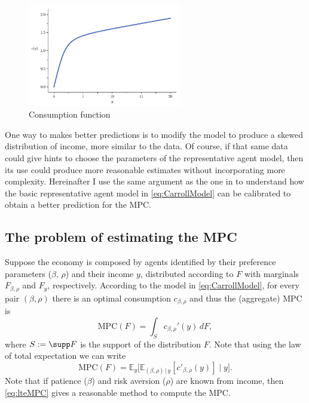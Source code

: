 \documentclass[english, a4paper, 12pt]{article}
\begin{document}
	\begin{figure}[H]
		\caption{Consumption function}
		\label{fig:concaveC}
		\includegraphics[width=0.6\textwidth]{CarrollCons}
		\vspace{-1ex}
	\end{figure}
	
One way to makes better predictions is to modify the model to produce a skewed distribution of income, more similar to the data. Of course, if that same data could give hints to choose the parameters of the representative agent model, then its use could produce more reasonable estimates without incorporating more complexity. Hereinafter I use the same argument as the one in  to understand how the basic representative agent model in \eqref{eq:CarrollModel} can be calibrated to obtain a better prediction for the MPC.

\subsection{The problem of estimating the MPC}
Suppose the economy is composed by agents identified by their preference parameters ($\beta$, $\rho$) and their income $y$, distributed according to $F$ with marginals $F_{\beta, \rho}$ and $F_{y}$, respectively. According to the model in \eqref{eq:CarrollModel}, for every pair $(\beta,\rho)$ there is an optimal consumption $c_{\beta,\rho}$ and thus the (aggregate) MPC is 
	$$ \mathrm{MPC}(F) = \int_{S} c_{\beta,\rho}'(y) \, dF, $$
where $S := \supp F$ is the support of the distribution $F$. Note that using the law of total expectation we can write
	\begin{equation} \label{eq:lteMPC}
		\mathrm{MPC}(F) = \mathbb{E}_{y}\Big[ \mathbb{E}_{(\beta,\rho) \, | \, y}[c'_{\beta,\rho}(y)] \; \Big| \; y \Big].
	\end{equation}
Note that if patience ($\beta$) and risk aversion ($\rho$) are known from income, then \eqref{eq:lteMPC} gives a reasonable method to compute the MPC.
\end{document}
